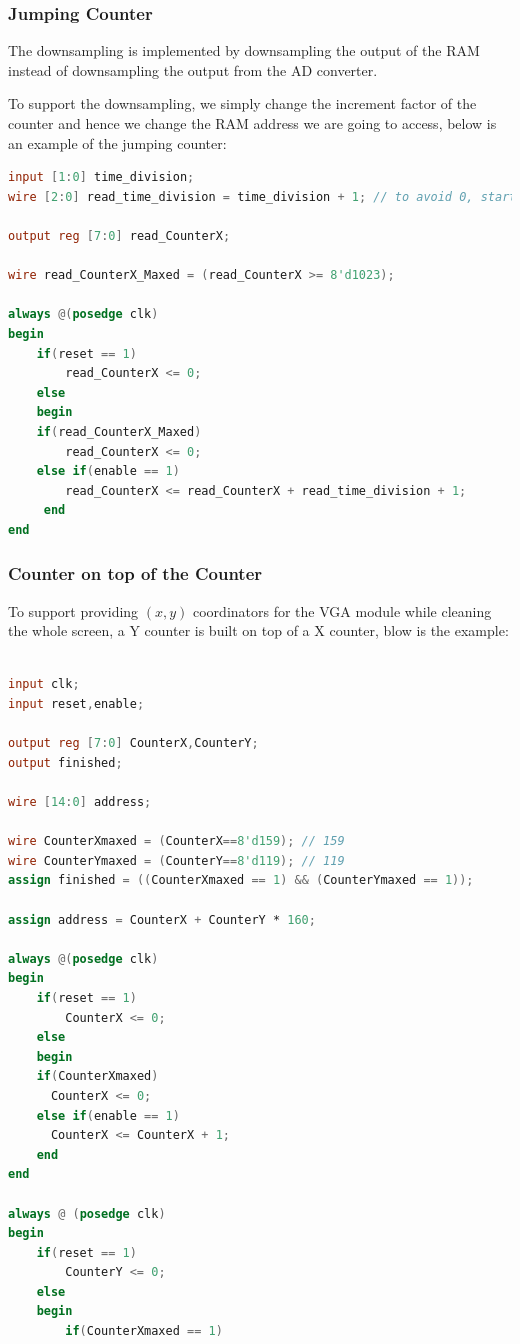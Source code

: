 \documentclass[11pt]{scrartcl}
\begin{document}
\subsubsection{Jumping Counter}
\label{sec:jumcount}

The downsampling is implemented by downsampling the output of the RAM instead of downsampling the output from the AD converter.

To support the downsampling, we simply change the increment factor of the counter and hence we change the RAM address we are going to access, below is an example of the jumping counter:
 
\begin{lstlisting}[language=Verilog]
input [1:0] time_division;
wire [2:0] read_time_division = time_division + 1; // to avoid 0, start from 1

output reg [7:0] read_CounterX;

wire read_CounterX_Maxed = (read_CounterX >= 8'd1023);

always @(posedge clk)
begin
	if(reset == 1)
		read_CounterX <= 0;
	else
	begin
	if(read_CounterX_Maxed)
	  	read_CounterX <= 0;
	else if(enable == 1)
	  	read_CounterX <= read_CounterX + read_time_division + 1;
	 end
end
\end{lstlisting}
\subsubsection{Counter on top of the Counter}
\label{sec:coucount}

To support providing $(x,y)$ coordinators for the VGA module while cleaning the whole screen, a Y counter is built on top of a X counter, blow is the example:
\begin{lstlisting}[language=Verilog]

input clk;
input reset,enable;

output reg [7:0] CounterX,CounterY;
output finished;

wire [14:0] address;

wire CounterXmaxed = (CounterX==8'd159); // 159
wire CounterYmaxed = (CounterY==8'd119); // 119
assign finished = ((CounterXmaxed == 1) && (CounterYmaxed == 1));

assign address = CounterX + CounterY * 160;

always @(posedge clk)
begin
	if(reset == 1)
		CounterX <= 0;
	else
	begin
	if(CounterXmaxed)
	  CounterX <= 0;
	else if(enable == 1)
	  CounterX <= CounterX + 1;
	end
end

always @ (posedge clk)
begin
	if(reset == 1)
		CounterY <= 0;
	else
	begin
		if(CounterXmaxed == 1)
\end{lstlisting}
\end{document}
